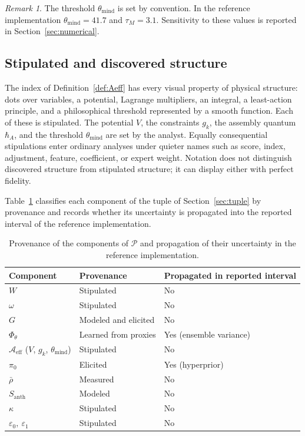 \documentclass[11pt]{article}
\theoremstyle{remark}
\newtheorem{remark}{Remark}[section]
\newcommand{\Aeff}{\mathcal{A}_{\mathrm{eff}}}
\newcommand{\Santh}{S_{\mathrm{anth}}}
\newcommand{\rhobar}{\bar{\rho}}
\newcommand{\eone}{\varepsilon_1}
\newcommand{\ezero}{\varepsilon_0}
\begin{document}
\begin{remark}
The threshold $\theta_{\mathrm{mind}}$ is set by convention. In the reference implementation $\theta_{\mathrm{mind}}=41.7$ and $\tau_M=3.1$. Sensitivity to these values is reported in Section~\ref{sec:numerical}.
\end{remark}

\subsection{Stipulated and discovered structure}

The index of Definition~\ref{def:Aeff} has every visual property of physical structure: dots over variables, a potential, Lagrange multipliers, an integral, a least-action principle, and a philosophical threshold represented by a smooth function. Each of these is stipulated. The potential $V$, the constraints $g_k$, the assembly quantum $\hbar_A$, and the threshold $\theta_{\mathrm{mind}}$ are set by the analyst. Equally consequential stipulations enter ordinary analyses under quieter names such as score, index, adjustment, feature, coefficient, or expert weight. Notation does not distinguish discovered structure from stipulated structure; it can display either with perfect fidelity.

Table~\ref{tab:prov} classifies each component of the tuple of Section~\ref{sec:tuple} by provenance and records whether its uncertainty is propagated into the reported interval of the reference implementation.

\begin{table}[h]
\centering
\caption{Provenance of the components of $\mathcal{P}$ and propagation of their uncertainty in the reference implementation.}\label{tab:prov}
\begin{tabular}{@{}lll@{}}
\toprule
Component & Provenance & Propagated in reported interval \\
\midrule
$W$ & Stipulated & No \\
$\omega$ & Stipulated & No \\
$G$ & Modeled and elicited & No \\
$\Phi_\theta$ & Learned from proxies & Yes (ensemble variance) \\
$\Aeff$ ($V$, $g_k$, $\theta_{\mathrm{mind}}$) & Stipulated & No \\
$\pi_0$ & Elicited & Yes (hyperprior) \\
$\rhobar$ & Measured & No \\
$\Santh$ & Modeled & No \\
$\kappa$ & Stipulated & No \\
$\ezero,\ \eone$ & Stipulated & No \\
\bottomrule
\end{tabular}
\end{table}
\end{document}
